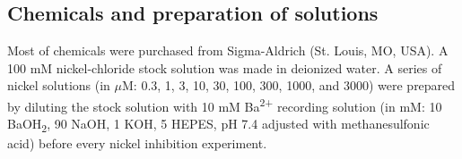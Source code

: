 \subsection*{Chemicals and preparation of solutions}

Most of chemicals were purchased from Sigma-Aldrich (St. Louis, MO, USA).
A 100 mM nickel-chloride stock solution was made in deionized water.
A series of nickel solutions (in $\mu$M: 0.3, 1, 3, 10, 30, 100, 300, 1000, and 3000) were prepared by diluting the stock solution with 10 mM Ba\textsuperscript{2+} recording solution (in mM: 10 BaOH\textsubscript{2}, 90 NaOH, 1 KOH, 5 HEPES, pH 7.4 adjusted with methanesulfonic acid) before every nickel inhibition experiment. 
